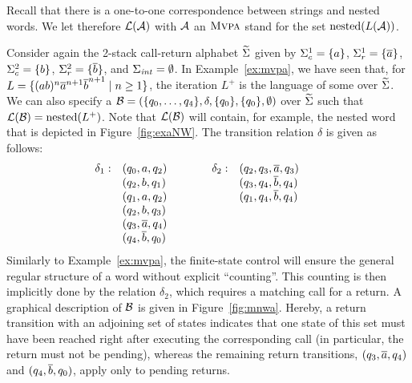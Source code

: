 \documentclass{LMCS}
\begin{document}
 Recall that there is a one-to-one correspondence between strings and nested
 words. We let therefore $\mathcal{L}(\mathcal{A})$ with $\mathcal{A}$ an $\textsc{Mvpa}$ stand for the set
 $\mathrm{nested}(L(\mathcal{A}))$.

\begin{exa}\label{ex:mnwa}
  Consider again the 2-stack call-return alphabet $\widetilde{\Sigma}$ given by
  $\Sigma_c^1 = \{ a \}$, $\Sigma_r^1 = \{ {\overline{a}} \}$, $\Sigma_c^2 = \{b\}$,
  $\Sigma_r^2 = \{ {\overline{b}} \}$, and $\Sigma_{\mathit{int}} = \emptyset$. In
  Example~\ref{ex:mvpa}, we have seen that, for $L=\{( a b )^n {\overline{a}} ^{n+1} {\overline{b}}
  ^{n+1} \mid n \ge 1\}$, the iteration $L^+$ is the language of some \tVPA
  over $\widetilde{\Sigma}$. We can also specify a \tNWA
  $\mathcal{B}=(\{q_0,\ldots,q_4\},\delta,\{q_0\},\{q_0\},\emptyset)$ over $\widetilde{\Sigma}$
  such that $\mathcal{L}(\mathcal{B}) = \mathrm{nested}(L^+)$. Note that $\mathcal{L}(\mathcal{B})$ will contain,
  for example, the nested word that is depicted in Figure~\ref{fig:exaNW}. The
  transition relation $\delta$ is given as follows:
  \[\hspace{-2em}\begin{array}{rlcrl}
    \delta_1: & (q_0, a ,q_2) & ~~~~~~ & \delta_2: & (q_2,q_3, \oa ,q_3) \\
    & (q_2, b ,q_1) & & & (q_3,q_4, \ob ,q_4)\\
    & (q_1, a ,q_2) & & & (q_1,q_4, \ob ,q_4)\\
    & (q_2, b ,q_3)\\
    & (q_3, \oa ,q_4)\\
    & (q_4, \ob ,q_0)
  \end{array}\]
Similarly to Example~\ref{ex:mvpa}, the finite-state control will ensure the
  general regular structure of a word without explicit ``counting''. This
  counting is then implicitly done by the relation $\delta_2$, which requires
  a matching call for a return. A graphical description of $\mathcal{B}$ is given in
  Figure~\ref{fig:mnwa}. Hereby, a return transition with an adjoining set of
  states indicates that one state of this set must have been reached right
  after executing the corresponding call (in particular, the return must not
  be pending), whereas the remaining return transitions, $(q_3,{\overline{a}},q_4)$ and
  $(q_4,{\overline{b}},q_0)$, apply only to pending returns.
\end{exa}
\end{document}
